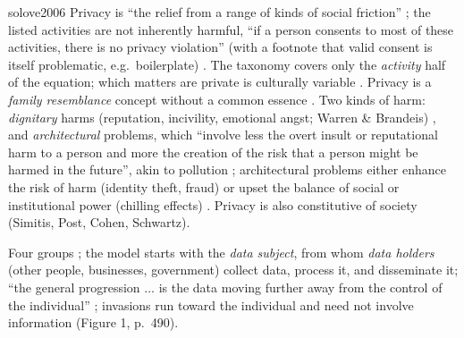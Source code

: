 \begin{papercard}{solove2006}
 Privacy is ``the relief from a range of kinds of social friction'' ; the listed activities are not inherently harmful, ``if a person consents to most of these activities, there is no privacy violation'' (with a footnote that valid consent is itself problematic, e.g.\ boilerplate) . The taxonomy covers only the \emph{activity} half of the equation; which matters are private is culturally variable . Privacy is a \emph{family resemblance} concept without a common essence . Two kinds of harm: \emph{dignitary} harms (reputation, incivility, emotional angst; Warren \& Brandeis) , and \emph{architectural} problems, which ``involve less the overt insult or reputational harm to a person and more the creation of the risk that a person might be harmed in the future'', akin to pollution ; architectural problems either enhance the risk of harm (identity theft, fraud) or upset the balance of social or institutional power (chilling effects) . Privacy is also constitutive of society (Simitis, Post, Cohen, Schwartz).

 Four groups ; the model starts with the \emph{data subject}, from whom \emph{data holders} (other people, businesses, government) collect data, process it, and disseminate it; ``the general progression ... is the data moving further away from the control of the individual'' ; invasions run toward the individual and need not involve information (Figure 1, p.\ 490).


\end{papercard}
